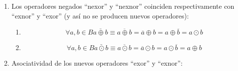 \documentclass[
]{article}
\providecommand{\tightlist}{%
  \setlength{\itemsep}{0pt}\setlength{\parskip}{0pt}}
\begin{document}
\begin{enumerate}
\begin{enumerate}
\begin{enumerate}
\begin{enumerate}
        Prueba:

        \[a \oplus {{{b = {{({\overline{a} \cdot b})} + {({a \cdot \overline{b}})}}} = {{\lbrack{{({\overline{a} \cdot b})} + a}\rbrack} \cdot {\lbrack{{({\overline{a} \cdot b})} + \overline{b}}\rbrack}}} = {{\lbrack{a + b}\rbrack} \cdot {\lbrack{\overline{a} + \overline{b}}\rbrack}}}\]

        \[\overline{a} \oplus {{{{\overline{b} = {{\lbrack{\overline{a} + \overline{b}}\rbrack} \cdot {\lbrack{\overline{\overline{a}} + \overline{\overline{b}}}\rbrack}}} = {{\lbrack{\overline{a} + \overline{b}}\rbrack} \cdot {\lbrack{a + b}\rbrack}}} = {{\lbrack{a + b}\rbrack} \cdot {\lbrack{\overline{a} + \overline{b}}\rbrack}}} = a} \oplus b\]
      \item
        \[\forall a,{b \in B}a \odot {b = \bar{a}} \odot \bar{b}\]

        Prueba:

        \[a \odot {{{b = {{({\overline{a} + b})} \cdot {({a + \overline{b}})}}} = {{\lbrack{{({\overline{a} + b})} \cdot a}\rbrack} + {\lbrack{{({\overline{a} + b})} \cdot \overline{b}}\rbrack}}} = {{\lbrack{a \cdot b}\rbrack} + {\lbrack{\overline{a} \cdot \overline{b}}\rbrack}}}\]

        \[\overline{a} \odot {{{{\overline{b} = {{\lbrack{\overline{a} \cdot \overline{b}}\rbrack} + {\lbrack{\overline{\overline{a}} \cdot \overline{\overline{b}}}\rbrack}}} = {{\lbrack{\overline{a} \cdot \overline{b}}\rbrack} + {\lbrack{a \cdot b}\rbrack}}} = {{\lbrack{a \cdot b}\rbrack} + {\lbrack{\overline{a} \cdot \overline{b}}\rbrack}}} = a} \odot b\]
      \end{enumerate}
    \item
      Los operadores negados ``nexor'' y ``nexnor'' coinciden
      respectivamente con ``exnor'' y ``exor'' (y así no se producen
      nuevos operadores):

      \begin{enumerate}
      \def\labelenumiv{\arabic{enumiv}.}
      \tightlist
      \item
        \[\forall a,{b \in B}{{\bar{a\oplus b} \equiv \overline{a\oplus b}} = \overline{a}} \oplus {b = a} \oplus {\overline{b} = a} \odot b\]
      \item
        \[\forall a,{b \in B}{{\bar{a\odot b} \equiv \overline{a\odot b}} = \overline{a}} \odot {b = a} \odot {\overline{b} = a} \oplus b\]
      \end{enumerate}
    \item
      Asociatividad de los nuevos operadores ``exor'' y ``exnor'':


\end{enumerate}
\end{enumerate}
\end{enumerate}
\end{document}
